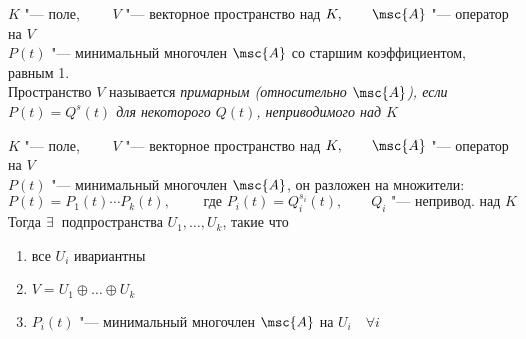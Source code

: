\begin{definition}
	$ K $ "--- поле, $ \qquad V $ "--- векторное пространство над $ K, \qquad \msc{A} $ "--- оператор на $ V $ \\
	$ P(t) $ "--- минимальный многочлен $ \msc{A} $ со старшим коэффициентом, равным 1. \\
	Пространство $ V $ называется \it{примарным} (относительно $ \msc{A} $), если $ P(t) = Q^s(t) $ для некоторого $ Q(t) $, неприводимого над $ K $
\end{definition}

\begin{theorem}
	$ K $ "--- поле, $ \qquad V $ "--- векторное пространство над $ K, \qquad \msc{A} $ "--- оператор на $ V $ \\
	$ P(t) $ "--- минимальный многочлен $ \msc{A} $, он разложен на множители:
	$$ P(t) = P_1(t) \cdots P_k(t), \qquad \text{ где } P_i(t) = Q_i^{s_i}(t), \qquad Q_i \text{ "--- непривод. над } K $$
	Тогда $ \exists\, $ подпространства $ U_1, \dots, U_k $, такие что
	\begin{enumerate}
		\item все $ U_i $ ивариантны
		\item $ V = U_1 \oplus \dots \oplus U_k $
		\item $ P_i(t) $ "--- минимальный многочлен $ \msc{A} $ на $ U_i \quad \forall i $
	\end{enumerate}
\end{theorem}

